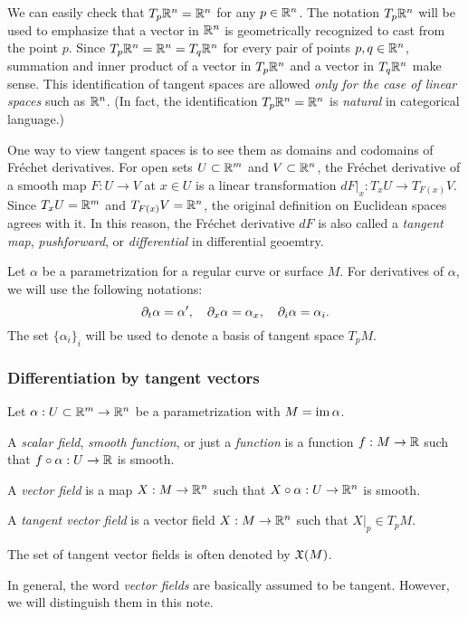 \documentclass{../exp}
\def\a{\alpha}
\begin{document}
\begin{rmk}
We can easily check that $T_p\mathbb{R}^n=\mathbb{R}^n$ for any $p\in\mathbb{R}^n$.
The notation $T_p\mathbb{R}^n$ will be used to emphasize that a vector in $\mathbb{R}^n$ is geometrically recognized to cast from the point $p$.
Since $T_p\mathbb{R}^n=\mathbb{R}^n=T_q\mathbb{R}^n$ for every pair of points $p,q\in\mathbb{R}^n$, summation and inner product of a vector in $T_p\mathbb{R}^n$ and a vector in $T_q\mathbb{R}^n$ make sense.
This identification of tangent spaces are allowed \emph{only for the case of linear spaces} such as $\mathbb{R}^n$.
(In fact, the identification $T_p\mathbb{R}^n=\mathbb{R}^n$ is \emph{natural} in categorical language.)
\end{rmk}
\begin{rmk}
One way to view tangent spaces is to see them as domains and codomains of Fr\'echet derivatives.
For open sets $U\subset\mathbb{R}^m$ and $V\subset\mathbb{R}^n$, the Fr\'echet derivative of a smooth map $F:U\to V$ at $x\in U$ is a linear transformation $dF|_x:T_xU\to T_{F(x)}V$.
Since $T_xU=\mathbb{R}^m$ and $T_{F(x)}V=\mathbb{R}^n$, the original definition on Euclidean spaces agrees with it.
In this reason, the Fr\'echet derivative $dF$ is also called a \emph{tangent map}, \emph{pushforward}, or \emph{differential} in differential geoemtry.
\end{rmk}


\begin{notn*}
Let $\a$ be a parametrization for a regular curve or surface $M$.
For derivatives of $\a$, we will use the following notations:
\[\pd_t\a=\a',\quad\pd_x\a=\a_x,\quad\pd_i\a=\a_i.\]
The set $\{\a_i\}_i$ will be used to denote a basis of tangent space $T_pM$.
\end{notn*}





\subsubsection{Differentiation by tangent vectors}


\begin{defn}
Let $\a:U\subset\R^m\to\R^n$ be a parametrization with $M=\im\a$.
\begin{cond}
\item A \emph{scalar field}, \emph{smooth function}, or just a \emph{function} is a function $f:M\to\R$ such that $f\o\a:U\to\R$ is smooth.
\item A \emph{vector field} is a map $X:M\to\R^n$ such that $X\o\a:U\to\R^n$ is smooth.
\item A \emph{tangent vector field} is a vector field $X:M\to\R^n$ such that $X|_p\in T_pM$.
\end{cond}
The set of tangent vector fields is often denoted by $\mathfrak{X}(M)$.
\end{defn}
\begin{rmk}
In general, the word \emph{vector fields} are basically assumed to be tangent.
However, we will distinguish them in this note.
\end{rmk}
\end{document}
